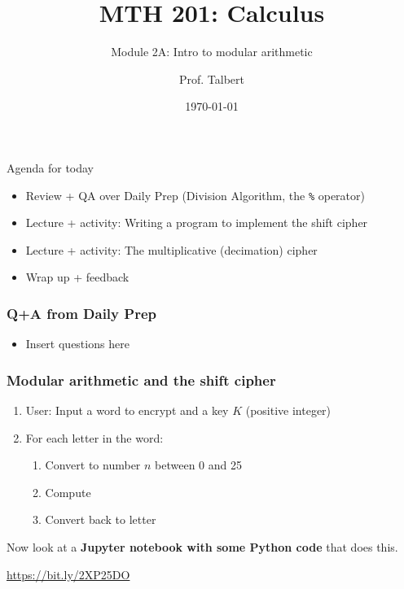 \documentclass{beamer}
\title{MTH 201: Calculus}
\subtitle{Module 2A: Intro to modular arithmetic}
\author{Prof. Talbert}
\institute{GVSU}
\date{\today}
\begin{document}
\frame{\titlepage}


\begin{frame}{Agenda for today}
    \begin{itemize}
        \item Review + QA over Daily Prep (Division Algorithm, the \texttt{\%} operator)
        \item Lecture + activity: Writing a program to implement the shift cipher 
        \item Lecture + activity: The multiplicative (decimation) cipher 
        \item Wrap up + feedback
    \end{itemize}
\end{frame}

\begin{frame}
    \frametitle{Q+A from Daily Prep}

    \begin{itemize}
        \item Insert questions here 
    \end{itemize}

\end{frame}

\begin{frame}[fragile]
    \frametitle{Modular arithmetic and the shift cipher}
    
    \begin{enumerate}
        \item User: Input a word to encrypt and a key $K$ (positive integer)
        \item For each letter in the word: 
        \begin{enumerate}
            \item Convert to number $n$ between 0 and 25 
            \item Compute \underline{\hspace{2in}}
            \item Convert back to letter 
        \end{enumerate}
    \end{enumerate}

Now look at a \textbf{Jupyter notebook with some Python code} that does this. 

\begin{center}
    \url{https://bit.ly/2XP25DO}
\end{center}

\end{frame}
\end{document}
